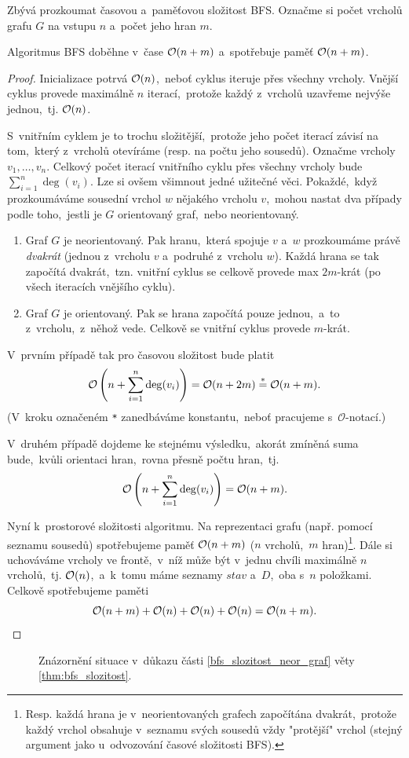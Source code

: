 Zbývá prozkoumat časovou a~paměťovou složitost BFS. Označme si počet vrcholů grafu $G$ na vstupu $n$ a~počet jeho hran $m$. 
\begin{theorem}\label{thm:bfs_slozitost}
    Algoritmus BFS doběhne v~čase $\mathcal{O}(n+m)$ a~spotřebuje paměť $\mathcal{O}(n+m)$.
\end{theorem}
\begin{proof}
    Inicializace potrvá $\mathcal{O}(n)$,~neboť cyklus iteruje přes všechny vrcholy. Vnější cyklus provede maximálně $n$ iterací,~protože každý z~vrcholů uzavřeme nejvýše jednou,~tj. $\mathcal{O}(n)$.

    S~vnitřním cyklem je to trochu složitější,~protože jeho počet iterací závisí na tom,~který z~vrcholů otevíráme (resp. na počtu jeho sousedů). Označme vrcholy $v_1,\dots,v_n$. Celkový počet iterací vnitřního cyklu přes všechny vrcholy bude $\sum_{i=1}^{n}\deg(v_i)$. Lze si ovšem všimnout jedné užitečné věci. Pokaždé,~když prozkoumáváme sousední vrchol $w$ nějakého vrcholu $v$,~mohou nastat dva případy podle toho,~jestli je $G$ orientovaný graf,~nebo neorientovaný.
    \begin{enumerate}[label=(\roman*)]
        \item\label{bfs_slozitost_neor_graf} Graf $G$ je neorientovaný. Pak hranu,~která spojuje $v$ a~$w$ prozkoumáme právě \emph{dvakrát} (jednou z~vrcholu $v$ a~podruhé z~vrcholu $w$). Každá hrana se tak započítá dvakrát,~tzn. vnitřní cyklus se celkově provede max $2m$-krát (po všech iteracích vnějšího cyklu).
        \item\label{bfs_slozitost_or_graf} Graf $G$ je orientovaný. Pak se hrana započítá pouze jednou,~a~to z~vrcholu,~z~něhož vede. Celkově se vnitřní cyklus provede $m$-krát.
    \end{enumerate}
    V~prvním případě tak pro časovou složitost bude platit
    \[\mathcal{O}\left(n+\sum_{i=1}^{n}\deg(v_i)\right)=\mathcal{O}(n+2m)\stackrel{*}{=}\mathcal{O}(n+m).\]
    (V~kroku označeném \texttt{*} zanedbáváme konstantu,~neboť pracujeme s~$\mathcal{O}$-notací.)\par
    V~druhém případě dojdeme ke stejnému výsledku,~akorát zmíněná suma bude,~kvůli orientaci hran,~rovna přesně počtu hran,~tj.
    \[\mathcal{O}\left(n+\sum_{i=1}^{n}\deg(v_i)\right)=\mathcal{O}(n+m).\]

    Nyní k~prostorové složitosti algoritmu. Na reprezentaci grafu (např. pomocí seznamu sousedů) spotřebujeme paměť $\mathcal{O}(n+m)$ ($n$ vrcholů,~$m$ hran)\footnote{Resp. každá hrana je v~neorientovaných grafech započítána dvakrát,~protože každý vrchol obsahuje v~seznamu svých sousedů vždy "protější" vrchol (stejný argument jako u~odvozování časové složitosti BFS).}. Dále si uchováváme vrcholy ve frontě,~v~níž může být v~jednu chvíli maximálně $n$ vrcholů,~tj. $\mathcal{O}(n)$,~a~k~tomu máme seznamy $stav$ a~$D$,~oba s~$n$ položkami. Celkově spotřebujeme paměti
    \[\mathcal{O}(n+m)+\mathcal{O}(n)+\mathcal{O}(n)+\mathcal{O}(n)=\mathcal{O}(n+m).\]
\end{proof}
\begin{figure}[ht]
    \centering
    
    \caption{Znázornění situace v~důkazu části \ref{bfs_slozitost_neor_graf} věty \ref{thm:bfs_slozitost}.}
\end{figure}
